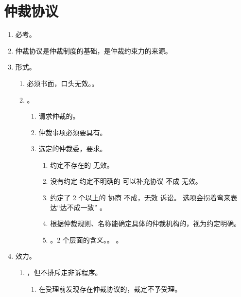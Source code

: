 \section{仲裁协议}
\begin{enumerate}
  \item 必考。
  \item 仲裁协议是仲裁制度的基础，是仲裁约束力的来源。
  \item 形式。
        \begin{enumerate}
          \item 必须书面，口头无效。。
          \item {}。
                \begin{enumerate}
                  \item 请求仲裁的。
                  \item 仲裁事项必须要具有。
                  \item 选定的仲裁委，要求。
                        \begin{enumerate}
                          \item 约定不存在的 \yjt 无效。
                          \item 没有约定 \hz 约定不明确的 \yjt 可以补充协议 \yjt 不成 \yjt 无效。
                          \item 约定了 2 个以上的 \yjt 协商 \yjt 不成，无效 \yjt 诉讼。
                                选项会拐着弯来表达“达不成一致” \yjt {}。
                          \item 根据仲裁规则、名称能确定具体的仲裁机构的，视为约定明确。
                          \item {}。2 个层面的含义。\yi {}。\er
                                。
                        \end{enumerate}
                \end{enumerate}
        \end{enumerate}
  \item 效力。
        \begin{enumerate}
          \item {}，但不排斥走非诉程序。
                \begin{enumerate}
                  \item 在受理前发现存在仲裁协议的，裁定不予受理。

\end{enumerate}
\end{enumerate}
\end{enumerate}
